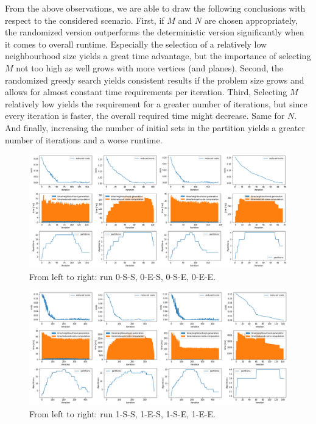 From the above observations, we are able to draw the following conclusions with respect to the considered scenario. First, if $M$ and $N$ are chosen appropriately, the randomized version outperforms the deterministic version significantly when it comes to overall runtime. Especially the selection of a relatively low neighbourhood size yields a great time advantage, but the importance of selecting $M$ not too high as well grows with more vertices (and planes). Second, the randomized greedy search yields consistent results if the problem size grows and allows for almost constant time requirements per iteration. Third, Selecting $M$ relatively low yields the requirement for a greater number of iterations, but since every iteration is faster, the overall required time might decrease. Same for $N$. And finally, increasing the number of initial sets in the partition yields a greater number of iterations and a worse runtime.


\begin{landscape}
    \begin{figure}
        \includegraphics[width=22cm]{pics/experiments_0.png}
        \caption{From left to right: run 0-S-S, 0-E-S, 0-S-E, 0-E-E.}
        \label{fig:setting11}
    \end{figure}
\end{landscape}


\begin{landscape}
    \begin{figure}
        \includegraphics[width=22cm]{pics/experiments_1.png}
        \caption{From left to right: run 1-S-S, 1-E-S, 1-S-E, 1-E-E.}
        \label{fig:setting12}
    \end{figure}
\end{landscape}

